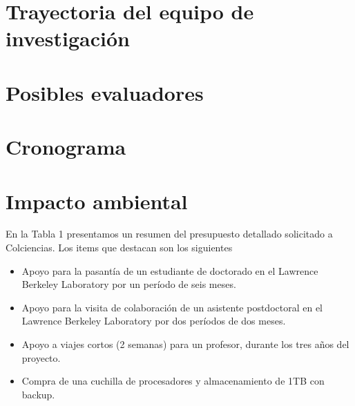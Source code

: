 \documentclass{article}
\begin{document}
\section{Trayectoria del equipo de investigaci\'on}


\section{Posibles evaluadores}

\section{Cronograma}

\section{Impacto ambiental}


En la Tabla 1 presentamos un resumen del presupuesto detallado
solicitado a Colciencias. Los items que destacan son los siguientes

\begin{itemize}

\item Apoyo para la pasant\'ia de un estudiante de doctorado en el
  Lawrence Berkeley Laboratory por un per\'iodo de seis meses.
\item Apoyo para la visita de colaboraci\'on de un asistente postdoctoral en el
  Lawrence Berkeley Laboratory por dos per\'iodos de dos meses.
\item Apoyo a viajes cortos (2 semanas) para un profesor, durante los
  tres a\~nos del proyecto. 
\item Compra de una cuchilla de procesadores y almacenamiento de 1TB
  con backup.
\end{itemize}
\end{document}

